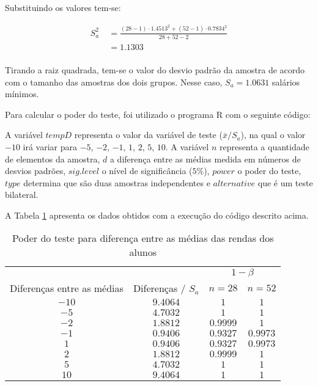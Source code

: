 Substituindo os valores tem-se:

\begin{align*}
 S^2_a &\; = \frac{(28 - 1) \cdot 1.4513^2 + (52 - 1) \cdot 0.7834^2}{28 + 52 - 2} \\
       &\; = 1.1303 \\
\end{align*}

Tirando a raiz quadrada, tem-se o valor do desvio padrão da amostra de acordo com o tamanho das amostras dos dois grupos. Nesse caso, $S_a = 1.0631$ salários mínimos.

Para calcular o poder do teste, foi utilizado o programa R com o seguinte código:


A variável $tempD$ representa o valor da variável de teste ($\bar{x} / S_a$), na qual o valor $-10$ irá variar para $-5$, $-2$, $-1$, $1$, $2$, $5$, $10$. A variável $n$ representa a quantidade de 
elementos da amostra, $d$ a diferença entre as médias medida em números de desvios padrões, $sig. level$ o nível de significância ($5\%$), $power$ o poder do teste, $type$ determina que são duas 
amostras independentes e $alternative$ que é um teste bilateral.

A Tabela \ref{tb:5b} apresenta os dados obtidos com a execução do código descrito acima.

\begin{table}[ht]
\centering
\caption{Poder do teste para diferença entre as médias das rendas dos alunos} 
\label{tb:5b}
\begin{tabular}{cccc}
  \toprule
  & & \multicolumn{2}{c}{$1 - \beta$} \\
  \cline{3-4}
  Diferenças entre as médias & Diferenças / $S_a$  & $n = 28$ & $n = 52$ \\
  \midrule
 $-10$ & $9.4064$ & $1$ & $1$ \\ 
 $-5$  & $4.7032$ & $1$ & $1$ \\
 $-2$  & $1.8812$ & $0.9999$ & $1$ \\
 $-1$  & $0.9406$ & $0.9327$ & $0.9973$ \\
 $1$   & $0.9406$ & $0.9327$ & $0.9973$ \\
 $2$   & $1.8812$ & $0.9999$ & $1$ \\
 $5$   & $4.7032$ & $1$ & $1$ \\
 $10$  & $9.4064$ & $1$ & $1$ \\
   \bottomrule
\end{tabular}
\end{table}

